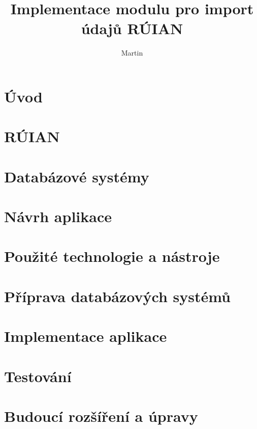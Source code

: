 \documentclass[czech, kiv, ba, he, iso690numb, pdf, viewonly]{fasthesis}
\title{Implementace modulu pro import údajů RÚIAN}
\author{Martin}{Schön}{}{}
\begin{document}
\frontpages[tm]
\tableofcontents

\chapter{Úvod}


\chapter{RÚIAN}


\chapter{Databázové systémy}


\chapter{Návrh aplikace}


\chapter{Použité technologie a nástroje}


\chapter{Příprava databázových systémů}


\chapter{Implementace aplikace}





\chapter{Testování}


\chapter{Budoucí rozšíření a úpravy}

\end{document}

